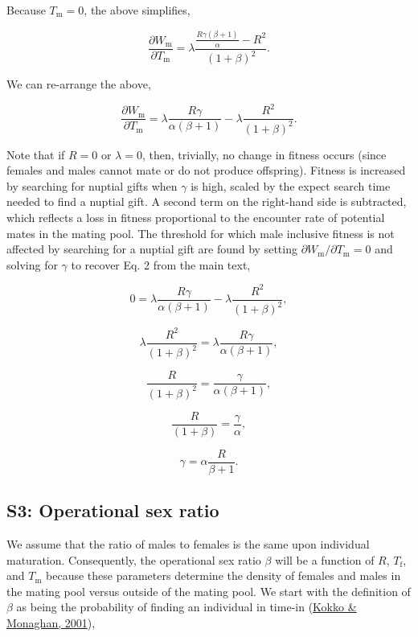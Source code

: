 \documentclass[
]{article}
\begin{document}
Because \(T_{\mathrm{m}} = 0\), the above simplifies,

\[\frac{\partial W_{\mathrm{m}}}{\partial T_{\mathrm{m}}} = \lambda \frac{\frac{R\gamma\left(\beta + 1\right)}{\alpha} - R^{2}}{\left(1 + \beta \right)^{2}}.\]

We can re-arrange the above,

\[\frac{\partial W_{\mathrm{m}}}{\partial T_{\mathrm{m}}} = \lambda \frac{R\gamma}{\alpha\left(\beta+1\right)} - \lambda\frac{R^{2}}{{\left(1 + \beta \right)^{2}}}.\]

Note that if \(R = 0\) or \(\lambda = 0\), then, trivially, no change in
fitness occurs (since females and males cannot mate or do not produce
offspring). Fitness is increased by searching for nuptial gifts when
\(\gamma\) is high, scaled by the expect search time needed to find a
nuptial gift. A second term on the right-hand side is subtracted, which
reflects a loss in fitness proportional to the encounter rate of
potential mates in the mating pool. The threshold for which male
inclusive fitness is not affected by searching for a nuptial gift are
found by setting \(\partial W_{\mathrm{m}}/\partial T_{\mathrm{m}} = 0\)
and solving for \(\gamma\) to recover Eq. 2 from the main text,

\[0 = \lambda \frac{R\gamma}{\alpha\left(\beta+1\right)} - \lambda\frac{R^{2}}{{\left(1 + \beta \right)^{2}}},\]

\[\lambda\frac{R^{2}}{{\left(1 + \beta \right)^{2}}} = \lambda \frac{R\gamma}{\alpha\left(\beta+1\right)},\]

\[\frac{R}{{\left(1 + \beta \right)^{2}}} =  \frac{\gamma}{\alpha\left(\beta+1\right)},\]

\[\frac{R}{{\left(1 + \beta \right)}} =  \frac{\gamma}{\alpha},\]

\[\gamma = \alpha \frac{R }{\beta + 1}.\]

\clearpage

\hypertarget{s3-operational-sex-ratio}{%
\subsection{S3: Operational sex ratio}\label{s3-operational-sex-ratio}}

We assume that the ratio of males to females is the same upon individual
maturation. Consequently, the operational sex ratio \(\beta\) will be a
function of \(R\), \(T_{\mathrm{f}}\), and \(T_{\mathrm{m}}\) because
these parameters determine the density of females and males in the
mating pool versus outside of the mating pool. We start with the
definition of \(\beta\) as being the probability of finding an
individual in time-in (\protect\hyperlink{ref-Kokko2001}{Kokko \&
Monaghan, 2001}),
\end{document}
